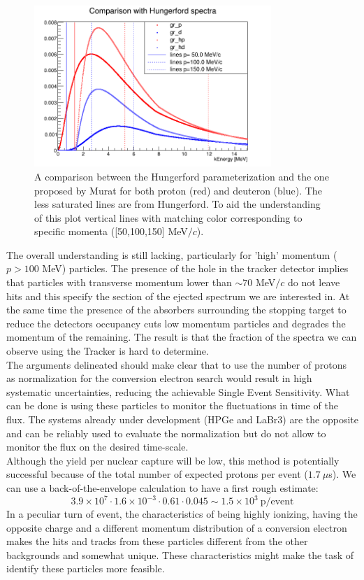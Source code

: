 \documentclass[12pt,a4paper,openright, oneside, titlepage]{book} %
\begin{document}
\begin{figure}[h!]
\centering
\includegraphics[width =0.8\textwidth, keepaspectratio]{new_spectra_2/comparison2}
\caption{A comparison \cite{io:comparison} between the Hungerford parameterization \cite{Hungerford} and the one proposed by Murat \cite{Pasha:spectra} for both proton (red) and deuteron (blue). The less saturated lines are from Hungerford. To aid the understanding of this plot vertical lines with matching color corresponding to specific momenta ([50,100,150] MeV$/c$).}
\label{_Comparison}
\end{figure}

\noindent The overall understanding is still lacking, particularly for 'high' momentum ($p>100$ MeV) particles.
The presence of the hole in the tracker detector implies that particles with transverse momentum lower than $\sim70$ MeV$/c$ do not leave hits and this specify the section of the ejected spectrum we are interested in. 
At the same time the presence of the absorbers surrounding the stopping target to reduce the detectors occupancy cuts low momentum particles and degrades the momentum of the remaining. 
The result is that the fraction of the spectra we can observe using the Tracker is hard to determine.\\ 

\noindent The arguments delineated should make clear that to use the number of protons as normalization for the conversion electron search would result in high systematic uncertainties, reducing the achievable Single Event Sensitivity. 
What can be done is using these particles to monitor the fluctuations in time of the flux. 
The systems already under development (HPGe and LaBr3) are the opposite and can be reliably used to evaluate the normalization but do not allow to monitor the flux on the desired time-scale.\\
Although the yield per nuclear capture will be low, this method is potentially successful because of the total number of expected protons per event ($1.7\ \mu$s). We can use a back-of-the-envelope calculation to have a first rough estimate:
$$3.9\times10^7 \cdot 1.6\times10^{-3} \cdot 0.61 \cdot 0.045 \sim 1.5\times10^3\ \text{p/event}$$
In a peculiar turn of event, the characteristics of being highly ionizing, having the opposite charge and a different momentum distribution of a conversion electron makes the hits and tracks from these particles different from the other backgrounds and somewhat unique. These characteristics might make the task of identify these particles more feasible.
\end{document}
